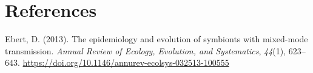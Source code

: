 \documentclass[10pt]{article}
\begin{document}
\clearpage
\section*{References}\sloppy
{}
\label{csl:1}Ebert, D. (2013). {The epidemiology and evolution of symbionts with mixed-mode transmission}. \textit{Annual Review of Ecology, Evolution, and Systematics}, \textit{44}(1), 623–643. \url{https://doi.org/10.1146/annurev-ecolsys-032513-100555}
\end{document}
